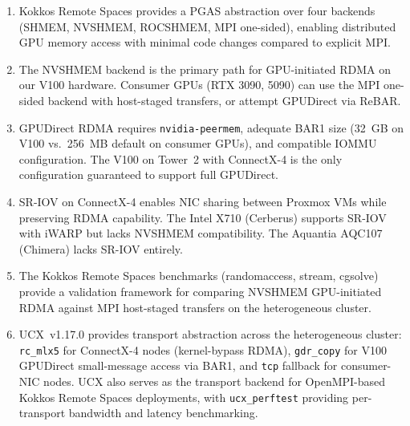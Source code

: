 \documentclass[11pt,letterpaper]{article}
\begin{document}
\begin{enumerate}[noitemsep]
    \item Kokkos Remote Spaces provides a PGAS abstraction over four backends (SHMEM, NVSHMEM, ROCSHMEM, MPI one-sided), enabling distributed GPU memory access with minimal code changes compared to explicit MPI.

    \item The NVSHMEM backend is the primary path for GPU-initiated RDMA on our V100 hardware. Consumer GPUs (RTX 3090, 5090) can use the MPI one-sided backend with host-staged transfers, or attempt GPUDirect via ReBAR.

    \item GPUDirect RDMA requires \texttt{nvidia-peermem}, adequate BAR1 size (32~GB on V100 vs.\ 256~MB default on consumer GPUs), and compatible IOMMU configuration. The V100 on Tower~2 with ConnectX-4 is the only configuration guaranteed to support full GPUDirect.

    \item SR-IOV on ConnectX-4 enables NIC sharing between Proxmox VMs while preserving RDMA capability. The Intel X710 (Cerberus) supports SR-IOV with iWARP but lacks NVSHMEM compatibility. The Aquantia AQC107 (Chimera) lacks SR-IOV entirely.

    \item The Kokkos Remote Spaces benchmarks (randomaccess, stream, cgsolve) provide a validation framework for comparing NVSHMEM GPU-initiated RDMA against MPI host-staged transfers on the heterogeneous cluster.

    \item UCX~v1.17.0 provides transport abstraction across the heterogeneous cluster: \texttt{rc\_mlx5} for ConnectX-4 nodes (kernel-bypass RDMA), \texttt{gdr\_copy} for V100 GPUDirect small-message access via BAR1, and \texttt{tcp} fallback for consumer-NIC nodes. UCX also serves as the transport backend for OpenMPI-based Kokkos Remote Spaces deployments, with \texttt{ucx\_perftest} providing per-transport bandwidth and latency benchmarking.
\end{enumerate}



\end{document}
